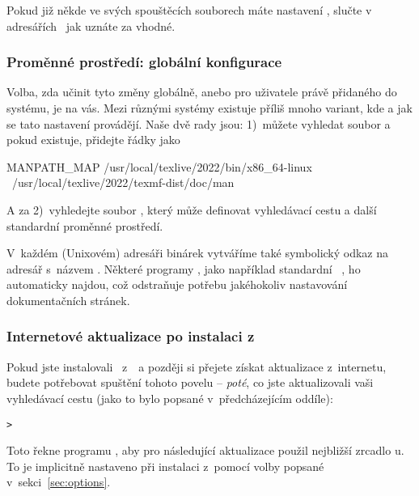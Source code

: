 \documentclass[\classoptions,slovak,english,czech]{\classname}
\begin{document}
Pokud již někde ve svých spouštěcích souborech máte nastavení , 
slučte v adresářích \TL\, jak uznáte za vhodné. 


\subsubsection{Proměnné prostředí: globální konfigurace}
\label{sec:envglobal}
Volba, zda učinit tyto změny globálně, anebo pro uživatele právě
přidaného do systému, je na vás. Mezi různými systémy existuje 
příliš mnoho variant, kde a jak se tato nastavení provádějí.
Naše dvě rady jsou: 1)~můžete vyhledat soubor
 a pokud existuje, přidejte řádky jako

\begin{sverbatim}
MANPATH_MAP /usr/local/texlive/2022/bin/x86_64-linux \
            /usr/local/texlive/2022/texmf-dist/doc/man
\end{sverbatim}

A za 2)~vyhledejte soubor ,
který může definovat vyhledávací cestu a další standardní 
proměnné prostředí.

V~každém (Unixovém) adresáři binárek vytváříme také symbolický 
odkaz na adresář  s~názvem .
Některé programy , jako například standardní
\MacOSX\ \code{man}, ho automaticky najdou, což odstraňuje
potřebu jakéhokoliv nastavování dokumentačních stránek.

\subsubsection{Internetové aktualizace po instalaci z~\protect\DVD}
\label{sec:dvd-install-net-updates}

Pokud jste instalovali \TL\ z~\DVD\ a později si přejete
získat aktualizace z~internetu, budete potřebovat spuštění
tohoto povelu -- \emph{poté}, co jste aktualizovali vaši
vyhledávací cestu (jako to bylo popsané v~předcházejícím oddíle):

\begin{alltt}
> 
\end{alltt}

Toto řekne programu , aby pro následující
aktualizace použil nejbližší zrcadlo \CTAN{}u.
To je implicitně nastaveno při instalaci
z~\DVD pomocí volby popsané v~sekci~\ref{sec:options}. 
\end{document}
